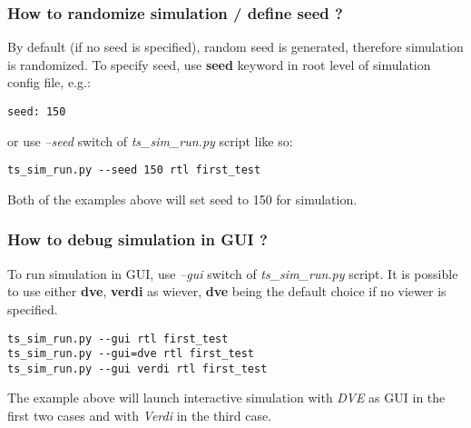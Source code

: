 \documentclass{tropic_design_spec}
\begin{document}
\subsubsection{How to randomize simulation / define seed ?}
\label{sec:how-to-randomize-simulation-define-seed}

By default (if no seed is specified), random seed is generated, therefore simulation
is randomized. To specify seed, use \textbf{seed} keyword in root level of simulation
config file, e.g.:

\begin{lstlisting}
seed: 150
\end{lstlisting}

or use \textit{--seed} switch of \textit{ts_sim_run.py} script like so:

\begin{lstlisting}
ts_sim_run.py --seed 150 rtl first_test
\end{lstlisting}

Both of the examples above will set seed to 150 for simulation.


\subsubsection{How to debug simulation in GUI ?}
\label{sec:how-to-debug-simulation-in-gui}

To run simulation in GUI, use \textit{--gui} switch of \textit{ts_sim_run.py} script.
It is possible to use either \textbf{dve}, \textbf{verdi} as wiever, \textbf{dve} being
the default choice if no viewer is specified.

\begin{lstlisting}
ts_sim_run.py --gui rtl first_test
ts_sim_run.py --gui=dve rtl first_test
ts_sim_run.py --gui verdi rtl first_test
\end{lstlisting}

The example above will launch interactive simulation with \textit{DVE} as GUI in the
first two cases and with \textit{Verdi} in the third case.



\end{document}
